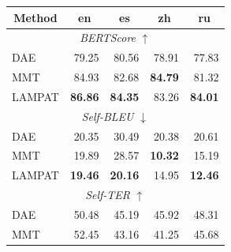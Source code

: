 \documentclass[letterpaper]{article} %
\begin{document}
\begin{table}[h!]
    \centering
    \fontsize{9pt}{9pt}\selectfont
    \begin{tabular}{|l|rrrr|} %
    \hline
\multicolumn{1}{|c|}{Method} & \multicolumn{1}{c}{en} & \multicolumn{1}{c}{es} & \multicolumn{1}{c}{zh} & \multicolumn{1}{c|}{ru} \\ \hline
\multicolumn{5}{|c|}{\textit{BERTScore} $\uparrow$}                                                                                                                                 \\ \hline
DAE                           & 79.25                           & 80.56                           & 78.91                           & 77.83                           \\
MMT                         & 84.93                           & 82.68                           & \textbf{84.79}                  & 81.32                           \\
LAMPAT                   & \textbf{86.86}                  & \textbf{84.35}                  & 83.26                           & \textbf{84.01}                  \\ \hline
\multicolumn{5}{|c|}{\textit{Self-BLEU} $\downarrow$}                                                                                                                                 \\ \hline
DAE                           & 20.35                           & 30.49                           & 20.38                           & 20.61                           \\
MMT                         & 19.89                           & 28.57                           & \textbf{10.32}                  & 15.19                           \\
LAMPAT                   & \textbf{19.46}                  & \textbf{20.16}                  & 14.95                           & \textbf{12.46}                  \\ \hline
\multicolumn{5}{|c|}{\textit{Self-TER} $\uparrow$}                                                                                                                                  \\ \hline
DAE                           & 50.48                           & 45.19                           & 45.92                           & 48.31                           \\
MMT                         & 52.45                           & 43.16                           & 41.25                           & 45.68                           \\

\end{tabular}
\end{table}
\end{document}
